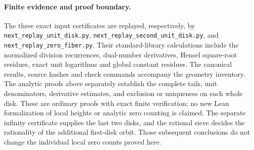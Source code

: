 \paragraph{Finite evidence and proof boundary.}
The three exact input certificates are replayed, respectively, by
\texttt{next\_replay\_unit\_disk.py},
\texttt{next\_replay\_second\_unit\_disk.py}, and
\texttt{next\_replay\_zero\_fiber.py}. Their standard-library
calculations include the normalized division recurrences, dual-number
derivatives, Hensel square-root residues, exact unit logarithms and
global constant residues. The canonical results, source hashes and
check commands accompany the geometry inventory. The analytic proofs
above separately establish the complete tails, unit denominators,
derivative estimates, and exclusion or uniqueness on each whole disk.
These are ordinary proofs with exact finite verification; no new Lean
formalization of local heights or analytic zero counting is claimed.
The separate infinity certificate supplies the last two disks, and
the rational sieve decides the rationality of the additional first-disk
orbit. Those subsequent conclusions do not change the individual
local zero counts proved here.
